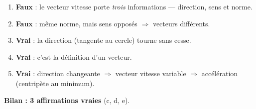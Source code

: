 \documentclass[11pt,a4paper]{article}
\begin{document}
\begin{corrige}
\begin{enumerate}[label=\alph*)]
  \item \textbf{Faux} : le vecteur vitesse porte \emph{trois} informations — direction, sens et norme.
  \item \textbf{Faux} : même norme, mais sens opposés $\Rightarrow$ vecteurs différents.
  \item \textbf{Vrai} : la direction (tangente au cercle) tourne sans cesse.
  \item \textbf{Vrai} : c'est la définition d'un vecteur.
  \item \textbf{Vrai} : direction changeante $\Rightarrow$ vecteur vitesse variable $\Rightarrow$ accélération (centripète au minimum).
\end{enumerate}
\textbf{Bilan : 3 affirmations vraies} (c, d, e).
\end{corrige}
\end{document}
